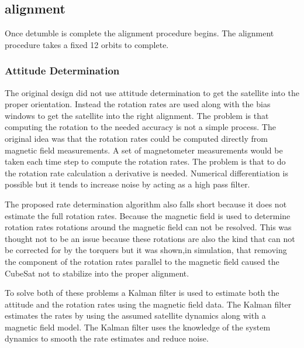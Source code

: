 \subsection{alignment}

Once detumble is complete the alignment procedure begins. The alignment procedure takes a fixed 12  orbits to complete.

\subsubsection{Attitude Determination}

The original design did not use attitude determination to get the satellite into the proper orientation. Instead the rotation rates are used along with the bias windows to get the satellite into the right alignment. The problem is that computing the rotation to the needed accuracy is not a simple process. The original idea was that the rotation rates could be computed directly from magnetic field measurements. A set of magnetometer measurements would be taken each time step to compute the rotation rates. The problem is that to do the rotation rate calculation a derivative is needed. Numerical differentiation is possible but it tends to increase noise by acting as a high pass filter.

The proposed rate determination algorithm also falls short because it does not estimate the full rotation rates. Because the magnetic field is used to determine rotation rates rotations around the magnetic field can not be resolved. This was thought not to be an issue because these rotations are also the kind that can not be corrected for by the torquers but it was shown,in simulation, that removing the component of the rotation rates parallel to the magnetic field caused the CubeSat not to stabilize into the proper alignment. 

To solve both of these problems a Kalman filter is used to estimate both the attitude and the rotation rates using the magnetic field data. The Kalman filter estimates the rates by using the assumed satellite dynamics along with a magnetic field model. The Kalman filter uses the knowledge of the system dynamics to smooth the rate estimates and reduce noise. 



